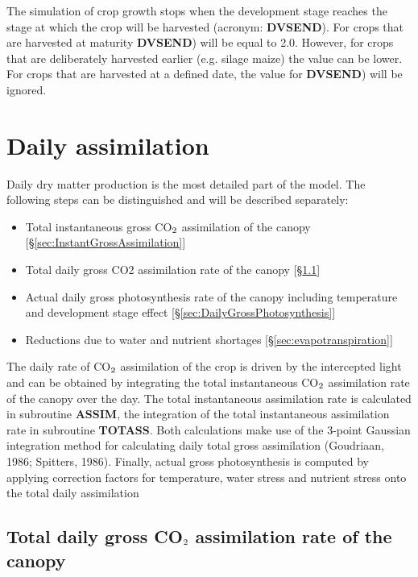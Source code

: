 The simulation of crop growth stops when the development stage reaches the stage at
which the crop will be harvested (acronym: {\bf DVSEND}). For crops that are harvested
at maturity {\bf DVSEND}) will be equal to 2.0. However, for crops that are deliberately
harvested earlier (e.g. silage maize) the value can be lower. For crops that are harvested
at a defined date, the value for {\bf DVSEND}) will be ignored.

\section{Daily assimilation} 

Daily dry matter production is the most detailed part of the model. The following steps
can be distinguished and will be described separately:
\begin{itemize}
	\item Total instantaneous gross CO$_{{\rm 2}}$ assimilation of the canopy 
	[\S \ref{sec:InstantGrossAssimilation}]
	\item Total daily gross CO2 assimilation rate of the canopy 
    [\S \ref{sec:DailyGrossAssimilation}]
	\item Actual daily gross photosynthesis rate of the canopy
	including temperature and development stage effect
    [\S \ref{sec:DailyGrossPhotosynthesis}]
	\item Reductions due to water and nutrient shortages
    [\S \ref{sec:evapotranspiration}]
\end{itemize}

The daily rate of CO$_{{\rm 2}}$ assimilation of the crop is driven by the intercepted light and can
be obtained by integrating the total instantaneous CO$_{{\rm 2}}$ assimilation rate of the canopy over
the day. The total instantaneous assimilation rate is calculated in subroutine {\bf ASSIM}, the
integration of the total instantaneous assimilation rate in subroutine {\bf TOTASS}. Both
calculations make use of the 3-point Gaussian integration method for calculating daily total 
gross assimilation (Goudriaan, 1986; Spitters, 1986).
Finally, actual gross photosynthesis is computed by applying correction factors for temperature,
water stress and nutrient stress onto the total daily assimilation

\subsection{Total daily gross CO$_{{\rm 2}}$ assimilation rate of the canopy}
\label{sec:DailyGrossAssimilation}

